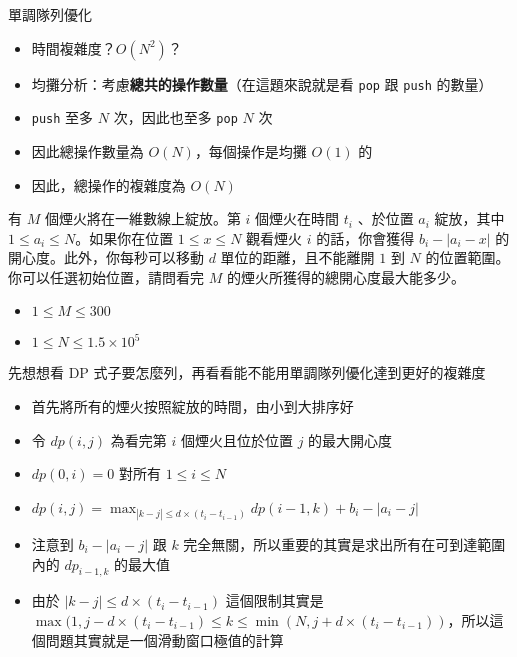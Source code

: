 \documentclass[standalone]{beamer}
\begin{document}
\begin{frame}{單調隊列優化}
  \begin{itemize}
    \item 時間複雜度？$O(N^2)$？
    \item 均攤分析：考慮\textbf{總共的操作數量}（在這題來說就是看 \texttt{pop} 跟 \texttt{push} 的數量）
    \item \texttt{push} 至多 $N$ 次，因此也至多 \texttt{pop} $N$ 次
    \item 因此總操作數量為 $O(N)$，每個操作是均攤 $O(1)$ 的
    \item 因此，總操作的複雜度為 $O(N)$
  \end{itemize}
\end{frame}

\begin{frame}{}
  \begin{problem}
    有 $M$ 個煙火將在一維數線上綻放。第 $i$ 個煙火在時間 $t_i$ 、於位置 $a_i$ 綻放，其中 $1 \leq a_i \leq N$。如果你在位置 $1 \leq x \leq N$ 觀看煙火 $i$ 的話，你會獲得 $b_i - |a_i - x|$ 的開心度。此外，你每秒可以移動 $d$ 單位的距離，且不能離開 $1$ 到 $N$ 的位置範圍。你可以任選初始位置，請問看完 $M$ 的煙火所獲得的總開心度最大能多少。

    \begin{itemize}
      \item $1 \leq M \leq 300$
      \item $1 \leq N \leq 1.5 \times 10^5$
    \end{itemize}
  \end{problem}
  先想想看 DP 式子要怎麼列，再看看能不能用單調隊列優化達到更好的複雜度
\end{frame}

\begin{frame}{}
  \begin{itemize}
    \item 首先將所有的煙火按照綻放的時間，由小到大排序好
    \item 令 $dp(i, j)$ 為看完第 $i$ 個煙火且位於位置 $j$ 的最大開心度
    \item $dp(0, i) = 0$ 對所有 $1 \leq i \leq N$
    \item $dp(i, j) = \max_{|k - j| \leq d \times (t_i - t_{i - 1})} dp(i - 1, k) + b_i - |a_i - j|$
    \item 注意到 $b_i - |a_i - j|$ 跟 $k$ 完全無關，所以重要的其實是求出所有在可到達範圍內的 $dp_{i - 1, k}$ 的最大值
    \item 由於 $|k - j| \leq d \times (t_i - t_{i - 1})$ 這個限制其實是 $\max(1, j - d \times (t_i - t_{i - 1}) \leq k \leq \min(N, j + d \times (t_i - t_{i - 1}))$，所以這個問題其實就是一個滑動窗口極值的計算
  \end{itemize}
\end{frame}
\end{document}
